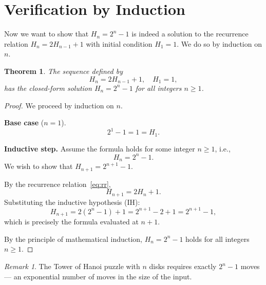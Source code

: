 \documentclass[12pt, a4paper]{article}
\theoremstyle{definition}
\theoremstyle{plain}
\newtheorem{theorem}{Theorem}[section]
\theoremstyle{remark}
\newtheorem*{remark}{Remark}
\begin{document}
\section{Verification by Induction}

Now we want to show that $H_n = 2^n - 1$ is indeed a solution to the
recurrence relation $H_n = 2H_{n-1} + 1$ with initial condition $H_1 = 1$.
We do so by induction on $n$.

\begin{theorem}
  The sequence defined by
  \[
    H_n = 2H_{n-1} + 1, \quad H_1 = 1,
  \]
  has the closed-form solution $H_n = 2^n - 1$ for all integers $n \ge 1$.
\end{theorem}

\begin{proof}
We proceed by induction on $n$.

\medskip
\noindent\textbf{Base case} ($n = 1$).
\[
  2^1 - 1 = 1 = H_1.
\]

\medskip
\noindent\textbf{Inductive step.}
Assume the formula holds for some integer $n \ge 1$, i.e.,
\[
  H_n = 2^n - 1 \tag{IH}.
\]
We wish to show that $H_{n+1} = 2^{n+1} - 1$.

By the recurrence relation~\eqref{eq:rr},
\[
  H_{n+1} = 2H_n + 1.
\]
Substituting the inductive hypothesis (IH):
\[
  H_{n+1}
  = 2\!\left(2^n - 1\right) + 1
  = 2^{n+1} - 2 + 1
  = 2^{n+1} - 1,
\]
which is precisely the formula evaluated at $n+1$.

\medskip
By the principle of mathematical induction, $H_n = 2^n - 1$ holds for
all integers $n \ge 1$.
\end{proof}

\bigskip

\begin{remark}
The Tower of Hanoi puzzle with $n$ disks requires exactly $2^n - 1$ moves ---
an exponential number of moves in the size of the input.
\end{remark}
\end{document}
